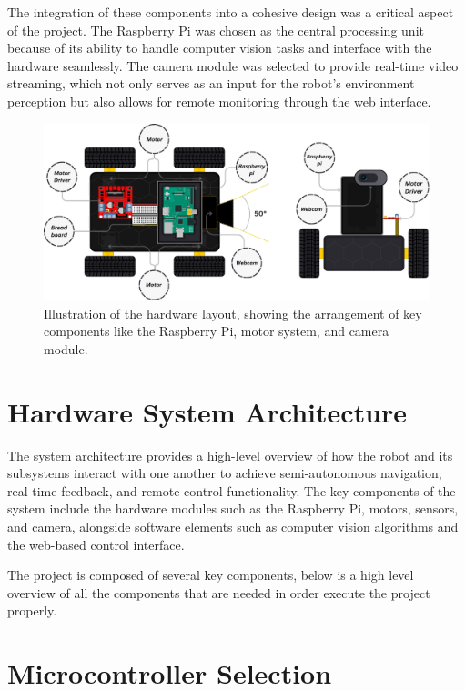 The integration of these components into a cohesive design was a critical aspect of the project. The Raspberry Pi was chosen as the central processing unit because of its ability to handle computer vision tasks and interface with the hardware seamlessly. The camera module was selected to provide real-time video streaming, which not only serves as an input for the robot’s environment perception but also allows for remote monitoring through the web interface.

\begin{figure}[H]
	\centering
	\includegraphics[width=1\textwidth]{ch4/figs/robot_car.png}
	\caption{Illustration of the hardware layout, showing the arrangement of key components like the Raspberry Pi, motor system, and camera module.}
	\label{fig:hardware_layout}
\end{figure}


\section{\label{sec:hardware} Hardware System Architecture}

The system architecture provides a high-level overview of how the robot and its subsystems interact with one another to achieve semi-autonomous navigation, real-time feedback, and remote control functionality. The key components of the system include the hardware modules such as the Raspberry Pi, motors, sensors, and camera, alongside software elements such as computer vision algorithms and the web-based control interface.

The project is composed of several key components, below is a high level overview of all the components that are needed in order execute the project properly.

\section{Microcontroller Selection}

